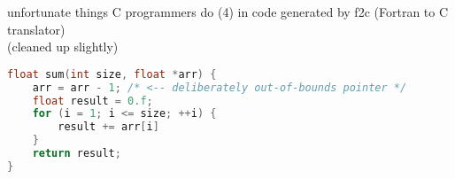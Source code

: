
\begin{frame}[fragile,label=unfortunateCProgF2C]{unfortunate things C programmers do (4)}
in code generated by f2c (Fortran to C translator) \\
{\scriptsize (cleaned up slightly)}
\begin{lstlisting}[language=C,style=small]
float sum(int size, float *arr) {
    arr = arr - 1; /* <-- deliberately out-of-bounds pointer */
    float result = 0.f;
    for (i = 1; i <= size; ++i) {
        result += arr[i]
    }
    return result;
}
\end{lstlisting}
\end{frame}

